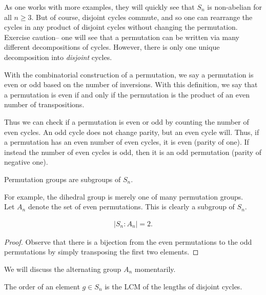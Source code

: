 \documentclass{memoir}
\begin{document}
As one works with more examples, they will quickly see that \(S_n\) is non-abelian for all \(n\geq 3\). But of course, disjoint cycles commute, and so one can rearrange the cycles in any product of disjoint cycles without changing the permutation.\\

Exercise caution-- one will see that a permutation can be written via many different decompositions of cycles. However, there is only one unique decomposition into \textit{disjoint} cycles.

\begin{cor}
With the combinatorial construction of a permutation, we say a permutation is even or odd based on the number of inversions. With this definition, we say that a permutation is even if and only if the permutation is the product of an even number of transpositions.
\end{cor}
Thus we can check if a permutation is even or odd by counting the number of even cycles. An odd cycle does not change parity, but an even cycle will. Thus, if a permutation has an even number of even cycles, it is even (parity of one). If instead the number of even cycles is odd, then it is an odd permutation (parity of negative one).\\

\begin{defn}
	Permutation groups are subgroups of \(S_n\).
\end{defn}
For example, the dihedral group is merely one of many permutation groups.\\

Let \(A_n\) denote the set of even permutations. This is clearly a subgroup of \(S_n\). 

\begin{prop}
\begin{align*}
	\left| S_n : A_n \right| =2.
\end{align*}
\end{prop}

\begin{proof}
Observe that there is a bijection from the even permutations to the odd permutations by simply transposing the first two elements.
\end{proof}

We will discuss the alternating group \(A_n\) momentarily.

\begin{hw}
The order of an element \(g \in S_n\) is the LCM of the lengths of disjoint cycles.
\end{hw}
\end{document}
